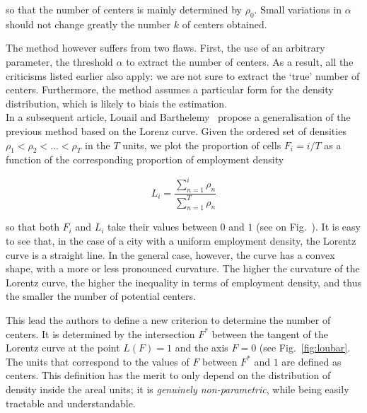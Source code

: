 so that the number of centers is mainly determined by $\rho_0$. Small variations
in $\alpha$ should not change greatly the number $k$ of centers obtained.

The method however suffers from two flaws. First, the use of an arbitrary
parameter, the threshold $\alpha$ to extract the number of centers. As a result,
all the criticisms listed earlier also apply: we are not sure to extract the
`true' number of centers. Furthermore, the method assumes a particular form for
the density distribution, which is likely to biais the estimation.\\

In a subsequent article, Louail and Barthelemy~\cite{Louail:2014} propose a
generalisation of the previous method based on the Lorenz curve.  Given the ordered set of
densities $\rho_1 < \rho_2 < \dots < \rho_T$ in the $T$ units, we plot the
proportion of cells $F_i=i/T$ as a function of the corresponding proportion of
employment density

\begin{equation}
    L_i = \frac{\sum_{n=1}^i \rho_n}{\sum_{n=1}^T \rho_n}
\end{equation}

so that both $F_i$ and $L_i$ take their values between $0$ and $1$ (see on
Fig.~\cite{fig:loubar}). It is easy
to see that, in the case of a city with a uniform employment density, the
Lorentz curve is a straight line. In the general case, however, the curve has a
convex shape, with a more or less pronounced curvature.  The higher the
curvature of the Lorentz curve, the higher the inequality in terms of employment
density, and thus the smaller the number of potential centers. 

This lead the authors to define a new criterion to determine the number of
centers. It is determined by the intersection $F^*$ between the tangent of the
Lorentz curve at the point $L(F) = 1$ and the axis $F=0$ (see
Fig.~\ref{fig:loubar}. The units that correspond to the values of $F$ between
$F^*$ and $1$ are defined as centers. This definition has the merit to only
depend on the distribution of density inside the areal units; it is \emph{genuinely
non-parametric}, while being easily tractable and understandable.\\


